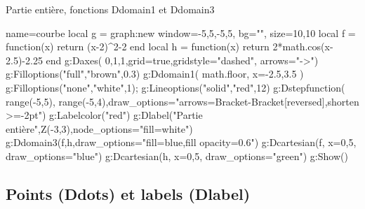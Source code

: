 \begin{demo}{Partie entière, fonctions Ddomain1 et Ddomain3}
\begin{luadraw}{name=courbe}
local g = graph:new{ window={-5,5,-5,5}, bg="", size={10,10} }
local f = function(x) return (x-2)^2-2 end
local h = function(x) return 2*math.cos(x-2.5)-2.25 end
g:Daxes( {0,1,1},{grid=true,gridstyle="dashed", arrows="->"})
g:Filloptions("full","brown",0.3)
g:Ddomain1( math.floor, { x={-2.5,3.5} })
g:Filloptions("none","white",1); g:Lineoptions("solid","red",12)
g:Dstepfunction( {range(-5,5), range(-5,4)},{draw_options="arrows={Bracket-Bracket[reversed]},shorten >=-2pt"})
g:Labelcolor("red")
g:Dlabel("Partie entière",Z(-3,3),{node_options="fill=white"})
g:Ddomain3(f,h,{draw_options="fill=blue,fill opacity=0.6"})
g:Dcartesian(f, {x={0,5}, draw_options="blue"})
g:Dcartesian(h, {x={0,5}, draw_options="green"})
g:Show()
\end{luadraw}
\end{demo}

\subsection{Points (Ddots) et labels (Dlabel)}

